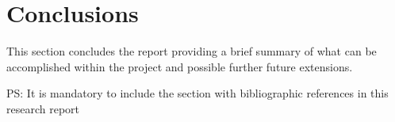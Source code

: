 \section{Conclusions}\label{sec:conclusions}

This section concludes the report providing a brief summary of what can be accomplished within the project and possible further future extensions.

PS: It is mandatory to include the section with bibliographic references in this research report